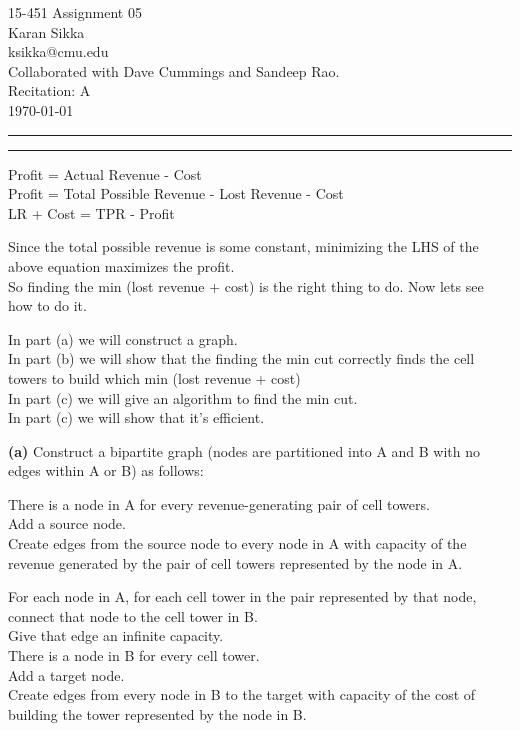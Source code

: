 \documentclass[11pt]{article}
\makeatletter
\newcommand{\question}[2] {\vspace{.25in} \hrule\vspace{0.5em}
\noindent{\bf #1: #2} \vspace{0.5em}
\hrule \vspace{.10in}}
\renewcommand{\part}[1] {\vspace{.10in} {\bf (#1)}}
\newcommand{\myname}{Karan Sikka}
\newcommand{\myandrew}{ksikka@cmu.edu}
\newcommand{\myhwnum}{05}
\makeatother
\begin{document}
\medskip

\thispagestyle{plain}
\begin{center}
{\Large 15-451 Assignment \myhwnum} \\
\myname \\
\myandrew \\
Collaborated with Dave Cummings and Sandeep Rao.\\
Recitation: A \\
\today \\
\end{center}

\question{1}{Cell Towers}
Profit = Actual Revenue - Cost\\
Profit = Total Possible Revenue - Lost Revenue - Cost\\
LR + Cost = TPR - Profit

Since the total possible revenue is some constant, minimizing the LHS of the above equation maximizes the profit.\\
So finding the min (lost revenue + cost) is the right thing to do. Now lets see how to do it.

In part (a) we will construct a graph.\\
In part (b) we will show that the finding the min cut correctly finds the cell towers to build which min (lost revenue + cost)\\
In part (c) we will give an algorithm to find the min cut.\\
In part (c) we will show that it's efficient.

\part{a}
Construct a bipartite graph (nodes are partitioned into A and B with no edges within A or B) as follows:

There is a node in A for every revenue-generating pair of cell towers.\\
Add a source node.\\
Create edges from the source node to every node in A with capacity of the revenue generated by the pair of cell towers represented by the node in A.

For each node in A, for each cell tower in the pair represented by that node, connect that node to the cell tower in B.\\
Give that edge an infinite capacity.
\\
There is a node in B for every cell tower.\\
Add a target node.\\
Create edges from every node in B to the target with capacity of the cost of building the tower represented by the node in B.
\end{document}
